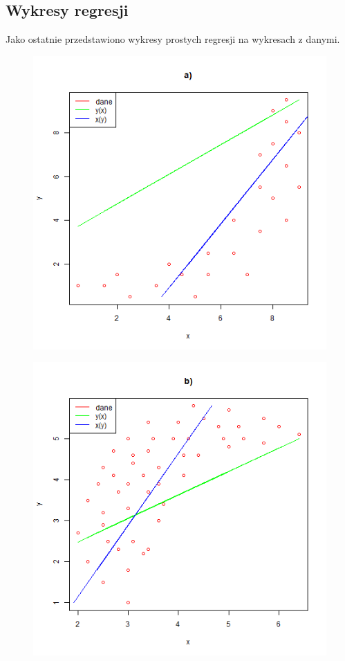 \documentclass{article}
\begin{document}
\subsection{Wykresy regresji}
Jako ostatnie przedstawiono wykresy prostych regresji na wykresach z danymi.
\begin{figure}[h!]
\begin{center}
\includegraphics[height = 0.5\textheight, angle = 0]{"w11zad1a_r.png"}
\end{center} \end{figure} 

\newpage
\begin{figure}[h!]
\begin{center}
\includegraphics[height = 0.5\textheight, angle = 0]{"w11zad1b_r.png"}
\end{center} \end{figure} 
\end{document}
